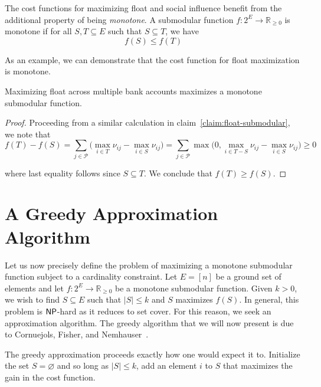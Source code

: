 \documentclass{article}
\begin{document}
The cost functions for maximizing float and social influence benefit from the additional property of being \emph{monotone}. A submodular function $f: 2^E \rightarrow \mathbb{R}_{\geq 0}$ is monotone if for all $S, T \subseteq E$ such that $S \subseteq T$, we have
\begin{equation*}
f(S) \leq f(T)
\end{equation*}

As an example, we can demonstrate that the cost function for float maximization is monotone.
\begin{claim}
Maximizing float across multiple bank accounts maximizes a monotone submodular function.
\end{claim}
\begin{proof}
Proceeding from a similar calculation in claim~\ref{claim:float-submodular}, we note that
\begin{equation*}
f(T) - f(S)
= \sum_{j \in \mathcal{P}} \bigg( \max_{i \in T} \nu_{ij} - \max_{i \in S} \nu_{ij} \bigg)
= \sum_{j \in \mathcal{P}} \max \bigg( 0, \max_{i \in T - S} \nu_{ij} - \max_{i \in S} \nu_{ij} \bigg)
\geq 0
\end{equation*}

where last equality follows since $S \subseteq T$. We conclude that $f(T) \geq f(S)$.
\end{proof}

\section{A Greedy Approximation Algorithm}

Let us now precisely define the problem of maximizing a monotone submodular function subject to a cardinality constraint. Let $E = [n]$ be a ground set of elements and let $f: 2^E \rightarrow \mathbb{R}_{\geq 0}$ be a monotone submodular function. Given $k > 0$, we wish to find $S \subseteq E$ such that $\lvert S \rvert \leq k$ and $S$ maximizes $f(S)$. In general, this problem is $\mathsf{NP}$-hard as it reduces to set cover. For this reason, we seek an approximation algorithm. The greedy algorithm that we will now present is due to Cornuejols, Fisher, and Nemhauser~\cite{CFN77}.

The greedy approximation proceeds exactly how one would expect it to. Initialize the set $S = \varnothing$ and so long as $\lvert S \rvert \leq k$, add an element $i$ to $S$ that maximizes the gain in the cost function.
\end{document}
